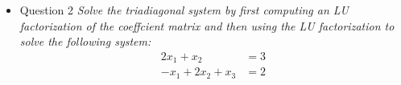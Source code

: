 \documentclass[12pt, letterpaper]{article}
\begin{document}
\begin{itemize}
\begin{enumerate}
\begin{align*}
			6 &= u_{11} l_{31}\\
			6 &= l_{31}\\
			u_{12} &= 2\\
			5 &= l_{21} u_{12} + u_{22}\\
			5 &= 6 + u_{22}\\
			-1 &= u_{22}\\
			1 &= u_{12} l_{31} + u_{22} l_{32}\\
			1 &= 2 \cdot 6 - l_{32}\\
			-11 &= -l_{32}\\
			11 &= l_{32}\\
			u_{13} &= 7\\
			-1 &= u_{13}l_{21} + u_{23}\\
			-1 &= 7 \cdot + u_{23}\\
			-22 &= u_{23}\\
			4 &= u_{13} l_{31} + u_{23} l_{32} + u_{33}\\
			4 &= 7 \cdot 6 - 22 \cdot ll + u_{33}\\
			204 &= u_{33}			
		\end{align*}
		Therefore 
		$$\begin{bmatrix}
		1 & 0 & 0\\
		3 & 1 & 0\\
		6 & 11 & 1
\end{bmatrix}		 = \begin{bmatrix}
		1 & 0 &0\\
		l_{21} & 1 & 0\\
		l_{31} & l_{32} & 1		
		\end{bmatrix},		
		\begin{bmatrix}
		1 & 2 & 7\\
		0 & -1 & -22\\
		0 & 0 & 204
		\end{bmatrix} = \begin{bmatrix}
		u_{11} & u_{12} & u_{13}\\
		0 & u_{22} & u_{23}\\
		0 & 0 & u_{33} 
		\end{bmatrix} 					
		$$
	\end{enumerate}
	\item{Question 2} \textit{Solve the triadiagonal system by first computing an LU factorization of the coeffcient matrix and then using the LU factorization to solve the following system:}
		\begin{align*}
	2x_1 + x_2 &= 3\\
	-x_1 + 2x_2 + x_3 &= 2\\

\end{align*}
\end{itemize}
\end{document}
